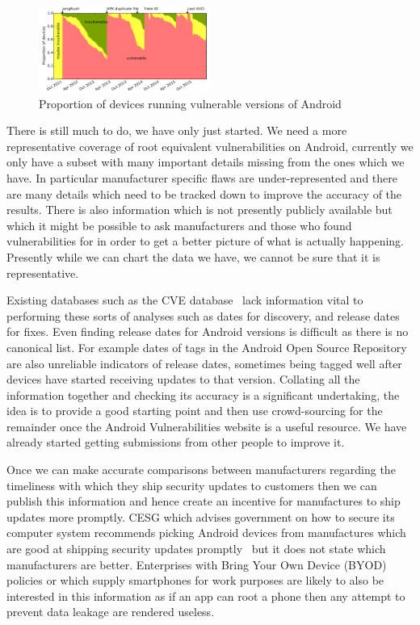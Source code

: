 \documentclass[a4paper,twocolumn]{article}
\begin{document}
\begin{figure}
 \includegraphics[width=0.5\textwidth]{figures/proportioninsecure.pdf}
 \caption{Proportion of devices running vulnerable versions of Android}
 \label{fig:propinsecure}
\end{figure}

There is still much to do, we have only just started.
We need a more representative coverage of root equivalent vulnerabilities on Android, currently we only have a subset with many important details missing from the ones which we have.
In particular manufacturer specific flaws are under-represented and there are many details which need to be tracked down to improve the accuracy of the results.
There is also information which is not presently publicly available but which it might be possible to ask manufacturers and those who found vulnerabilities for in order to get a better picture of what is actually happening.
Presently while we can chart the data we have, we cannot be sure that it is representative.

Existing databases such as the CVE database~\cite{cve-details} lack information vital to performing these sorts of analyses such as dates for discovery, and release dates for fixes.
Even finding release dates for Android versions is difficult as there is no canonical list.
For example dates of tags in the Android Open Source Repository are also unreliable indicators of release dates, sometimes being tagged well after devices have started receiving updates to that version.
Collating all the information together and checking its accuracy is a significant undertaking, the idea is to provide a good starting point and then use crowd-sourcing for the remainder once the Android Vulnerabilities website is a useful resource.
We have already started getting submissions from other people to improve it.

Once we can make accurate comparisons between manufacturers regarding the timeliness with which they ship security updates to customers then we can publish this information and hence create an incentive for manufactures to ship updates more promptly.
CESG which advises government on how to secure its computer system recommends picking Android devices from manufactures which are good at shipping security updates promptly~\cite{CESG2013} but it does not state which manufacturers are better.
Enterprises with Bring Your Own Device (BYOD) policies or which supply smartphones for work purposes are likely to also be interested in this information as if an app can root a phone then any attempt to prevent data leakage are rendered useless.
\end{document}
